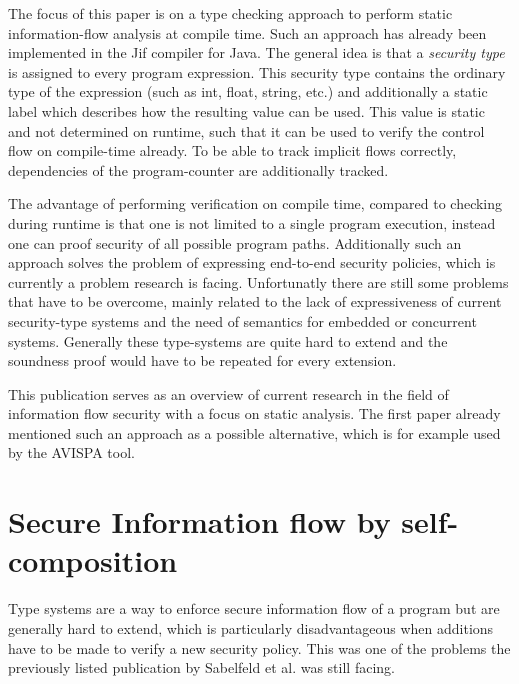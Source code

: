 \documentclass[a4paper,UKenglish]{lipics-v2018}
\begin{document}
The focus of this paper is on a type checking approach to perform static information-flow analysis at compile time. Such an approach has already been implemented in the Jif compiler for Java.\cite{JFlow} The general idea is that a \textit{security type} is assigned to every program expression. This security type contains the ordinary type of the expression (such as int, float, string, etc.) and additionally a static label which describes how the resulting value can be used. This value is static and not determined on runtime, such that it can be used to verify the control flow on compile-time already.\cite{language_based_information_flow_security}
To be able to track implicit flows correctly, dependencies of the program-counter are additionally tracked.

The advantage of performing verification on compile time, compared to checking during runtime is that one is not limited to a single program execution, instead one can proof security of all possible program paths.\cite{language_based_information_flow_security} Additionally such an approach solves the problem of expressing end-to-end security policies, which is currently a problem research is facing. Unfortunatly there are still some problems that have to be overcome, mainly related to the lack of expressiveness of current security-type systems and the need of semantics for embedded or concurrent systems. Generally these type-systems are quite hard to extend and the soundness proof would have to be repeated for every extension.\cite{language_based_information_flow_security}

This publication serves as an overview of current research in the field of information flow security with a focus on static analysis. The first paper already mentioned such an approach as a possible alternative, which is for example used by the AVISPA tool.\cite{model_checking_security_protocols}





\section{Secure Information flow by self-composition}

Type systems are a way to enforce secure information flow of a program but are generally hard to extend, which is particularly disadvantageous when additions have to be made to verify a new security policy. This was one of the problems the previously listed publication by Sabelfeld et al. was still facing.
\cite{language_based_information_flow_security} 
\end{document}
